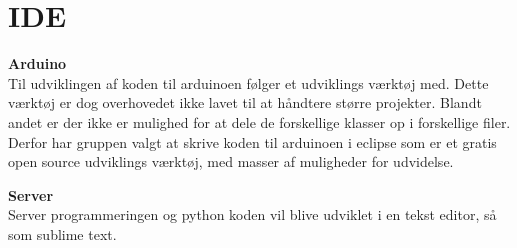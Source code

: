 \section{IDE}

\textbf{Arduino} \\
Til udviklingen af koden til arduinoen følger et udviklings værktøj med. Dette værktøj er dog overhovedet ikke lavet til at håndtere større projekter. Blandt andet er der ikke er mulighed for at dele de forskellige klasser op i forskellige filer. Derfor har gruppen valgt at skrive koden til arduinoen i eclipse som er et gratis open source udviklings værktøj, med masser af muligheder for udvidelse.

\textbf{Server} \\
Server programmeringen og python koden vil blive udviklet i en tekst editor, så som sublime text.  